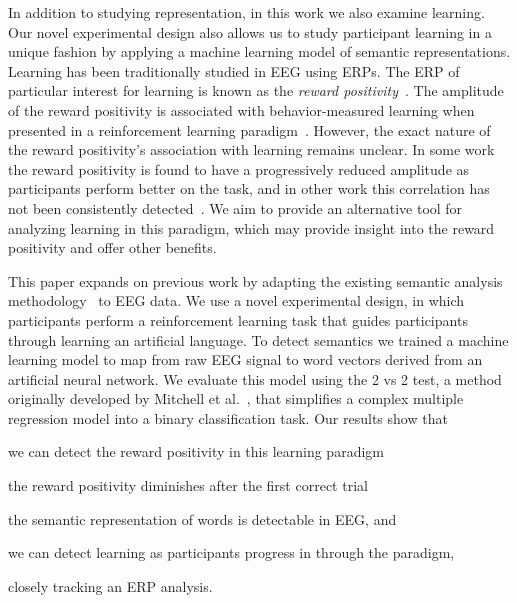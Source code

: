 In addition to studying representation, in this work we also examine learning. Our novel experimental design also allows us to study participant learning in a unique fashion by applying a machine learning model of semantic representations. Learning has been traditionally studied in EEG using ERPs. The ERP of particular interest for learning is known as the \emph{reward positivity}~\cite{proudfit2015reward}. The amplitude of the reward positivity is associated with behavior-measured learning when presented in a reinforcement learning paradigm~\cite{holroyd2002neural, sutton1998reinforcement, williams2017application}. However, the exact nature of the reward positivity's association with learning remains unclear. In some work the reward positivity is found to have a progressively reduced amplitude as participants perform better on the task, and in other work this correlation has not been consistently detected~\cite{walsh2012learning}. We aim to provide an alternative tool for analyzing learning in this paradigm, which may provide insight into the reward positivity and offer other benefits.

This paper expands on previous work by adapting the existing semantic analysis methodology~\cite{Mitchell2008,Sudre2012} to EEG data.  We use a novel experimental design, in which participants perform a reinforcement learning task that guides participants through learning an artificial language. To detect semantics we trained a machine learning model to map from raw EEG signal to word vectors derived from an artificial neural network. We evaluate this model using the 2 vs 2 test, a method originally developed by Mitchell et al.~\cite{Mitchell2008}, that simplifies a complex multiple regression model into a binary classification task. Our results show that 
\begin{inparaenum}[(1)]
  \item we can detect the reward positivity in this learning paradigm
  \item the reward positivity diminishes after the first correct trial
  \item the semantic representation of words is detectable in EEG, and 
  \item we can detect learning as participants progress in through the paradigm,
\end{inparaenum}
closely tracking an ERP analysis.
